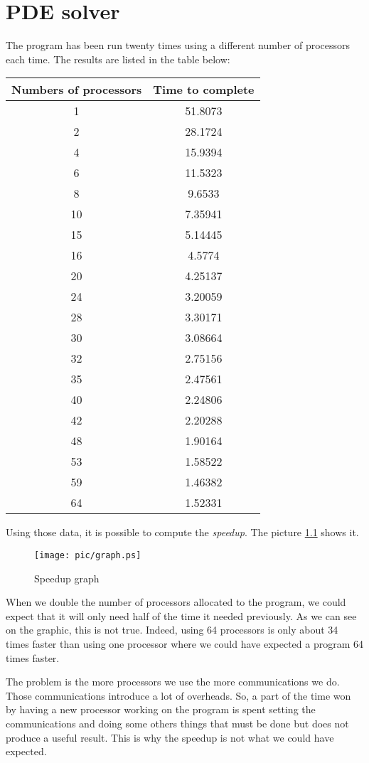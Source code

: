 \chapter{PDE solver}

The program has been run twenty times using a different number of processors each time. The results are listed in the table below:

\begin{center}
\begin{tabular}{|c|c|}
\hline
Numbers of processors & Time to complete \\
\hline
1 & 51.8073 \\
2 & 28.1724 \\
4 & 15.9394 \\
6 & 11.5323 \\
8 & 9.6533 \\
10 & 7.35941 \\
15 & 5.14445 \\
16 & 4.5774 \\
20 & 4.25137 \\ 
24 & 3.20059 \\ 
28 & 3.30171 \\
30 & 3.08664 \\
32 & 2.75156 \\
35 & 2.47561 \\
40 & 2.24806 \\
42 & 2.20288 \\
48 & 1.90164 \\
53 & 1.58522 \\
59 & 1.46382 \\
64 & 1.52331 \\
\hline
\end{tabular}
\end{center}

Using those data, it is possible to compute the \textit{speedup}. The picture \ref{graph} shows it.

\begin{figure}[!h]
\begin{center}
	\texttt{[image: pic/graph.ps]}
	\caption{Speedup graph}
	\label{graph}
\end{center}
\end{figure}

When we double the number of processors allocated to the program, we could expect that it will only need half of the time it needed previously. As we can see on the graphic, this is not true. Indeed, using 64 processors is only about 34 times faster than using one processor where we could have expected a program 64 times faster. 

The problem is the more processors we use the more communications we do. Those communications introduce a lot of overheads. So, a part of the time won by having a new processor working on the program is spent setting the communications and doing some others things that must be done but does not produce a useful result. This is why the speedup is not what we could have expected.
 
